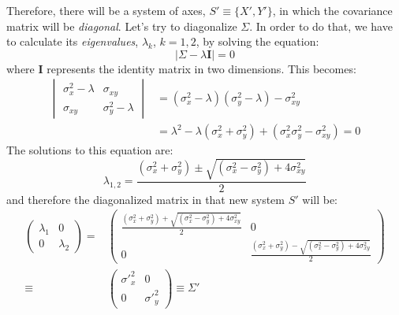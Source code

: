Therefore, there will be a system of axes, $S'\equiv\{X',Y'\}$, in
which the covariance matrix will be \emph{diagonal}. Let's try to
diagonalize $\Sigma$.  In order to do that, we have to calculate its
\emph{eigenvalues}, $\lambda_k$, $k=1,2$, by solving the equation:
%
\begin{equation}
  \label{eq:eigen}
  |\Sigma - \lambda \mathbf{I}| = 0
\end{equation}
% 
where $\mathbf{I}$ represents the identity matrix in two dimensions.
This becomes:
%
\begin{equation}
  \label{eq:eigen2}
  \begin{split}
    \begin{vmatrix}
      \sigma_x^2-\lambda & \sigma_{xy} \\ \sigma_{xy} & \sigma_y^2-\lambda
    \end{vmatrix}
    & = (\sigma_x^2-\lambda)(\sigma_y^2-\lambda) - \sigma_{xy}^2 \\
    & = \lambda^2 - \lambda(\sigma_x^2+\sigma_y^2) + 
    (\sigma_x^2\sigma_y^2 - \sigma_{xy}^2)  = 0
  \end{split}
\end{equation}
%
The solutions to this equation are:
%
\begin{equation}
  \label{eq:eigensol}
  \lambda_{1,2} = \frac{(\sigma_x^2+\sigma_y^2) \pm 
    \sqrt{(\sigma_x^2-\sigma_y^2) + 4\sigma_{xy}^2}}{2}
\end{equation}
%
and therefore the diagonalized matrix in that new system $S'$ will be:
%
\begin{equation}
  \begin{split}
    \label{eq:Snew}
    \begin{pmatrix}
      \lambda_1 & 0\\0 & \lambda_2
    \end{pmatrix}
    = &
    \begin{pmatrix}
      \displaystyle \frac{(\sigma_x^2+\sigma_y^2) +
        \sqrt{(\sigma_x^2-\sigma_y^2) + 4\sigma_{xy}^2}}{2} & 0 \\
      0 & \displaystyle \frac{(\sigma_x^2+\sigma_y^2) - 
        \sqrt{(\sigma_x^2-\sigma_y^2) + 4\sigma_{xy}^2}}{2}
    \end{pmatrix}\\
    \equiv &
    \begin{pmatrix}
      {\sigma'}_x^2 & 0\\0 & {\sigma'}_y^2
    \end{pmatrix}
    \equiv \Sigma'
  \end{split}
\end{equation}
